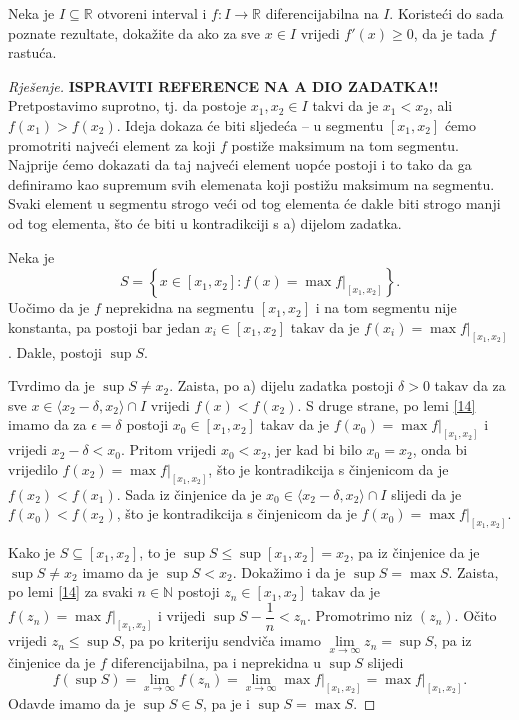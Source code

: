 \begin{exercise}
Neka je $I\subseteq \mathbb{R}$ otvoreni interval i $f : I \to \mathbb{R}$ diferencijabilna na $I$. Koristeći do sada poznate rezultate, dokažite da ako za sve $x\in I$ vrijedi $f'(x)\geq 0$, da je tada $f$ rastuća.
\end{exercise}
\begin{proof}[Rješenje]
\textbf{ISPRAVITI REFERENCE NA A DIO ZADATKA!!}
Pretpostavimo suprotno, tj. da postoje $x_1, x_2\in I$ takvi da je $x_1<x_2$, ali $f(x_1)>f(x_2)$. Ideja dokaza će biti sljedeća -- u segmentu $[x_1, x_2]$ ćemo promotriti najveći element za koji $f$ postiže maksimum na tom segmentu. Najprije ćemo dokazati da taj najveći element uopće postoji i to tako da ga definiramo kao supremum svih elemenata koji postižu maksimum na segmentu. Svaki element u segmentu strogo veći od tog elementa će dakle biti strogo manji od tog elementa, što će biti u kontradikciji s a) dijelom zadatka.

Neka je 
$$S=\left\{x\in [x_1, x_2] : f(x)=\max{f|_{[x_1, x_2]}}\right\}.$$ 
Uočimo da je $f$ neprekidna na segmentu $[x_1, x_2]$ i na tom segmentu nije konstanta, pa postoji bar jedan $x_i\in [x_1, x_2]$ takav da je $f(x_i)=\max{f|_{[x_1, x_2]}}$. Dakle, postoji $\sup{S}$.

Tvrdimo da je $\sup{S}\neq x_2$. Zaista, po a) dijelu zadatka postoji $\delta>0$ takav da za sve $x\in \langle x_2-\delta, x_2\rangle\cap I$ vrijedi $f(x)<f(x_2)$. S druge strane, po lemi \ref{14} imamo da za $\epsilon=\delta$ postoji $x_0\in [x_1, x_2]$ takav da je $f(x_0)=\max{f|_{[x_1, x_2]}}$ i vrijedi $x_2-\delta<x_0$. Pritom vrijedi $x_0<x_2$, jer kad bi bilo $x_0=x_2$, onda bi vrijedilo $f(x_2)=\max{f|_{[x_1, x_2]}}$, što je kontradikcija s činjenicom da je $f(x_2)<f(x_1)$. Sada iz činjenice da je $x_0\in \langle x_2-\delta, x_2\rangle\cap I$ slijedi da je $f(x_0)<f(x_2)$, što je kontradikcija s činjenicom da je $f(x_0)=\max{f|_{[x_1, x_2]}}$.

Kako je $S\subseteq [x_1, x_2]$, to je $\sup{S}\leq \sup{[x_1, x_2]}=x_2$, pa iz činjenice da je $\sup{S}\neq x_2$ imamo da je $\sup{S}<x_2$. Dokažimo i da je
$\sup{S}=\max{S}.$
Zaista, po lemi \ref{14} za svaki $n\in \mathbb{N}$ postoji $z_n\in [x_1, x_2]$ takav da je $f(z_n)=\max{f|_{[x_1, x_2]}}$ i vrijedi $\sup{S}-\dfrac{1}{n}<z_n$. Promotrimo niz $(z_n)$. Očito vrijedi $z_n\leq \sup{S}$, pa po kriteriju sendviča imamo $\lim\limits_{x\to\infty}{z_n}=\sup{S}$, pa iz činjenice da je $f$ diferencijabilna, pa i neprekidna u $\sup{S}$ slijedi
$$f(\sup{S})=\lim\limits_{x\to\infty}{f(z_n)}=\lim\limits_{x\to\infty}{\max{f|_{[x_1, x_2]}}}=\max{f|_{[x_1, x_2]}}.$$
Odavde imamo da je $\sup{S}\in S$, pa je i $\sup{S}=\max{S}$.


\end{proof}
